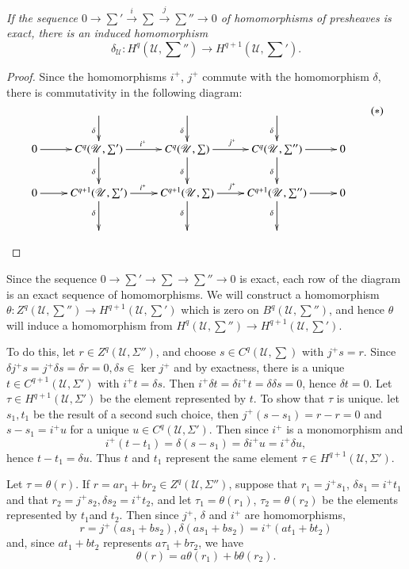\textit{If the sequence $ 0 \to \sum' \xrightarrow{i} \sum
  \xrightarrow{j} \sum'' \to 0$ of homomorphisms of presheaves is
  exact, there is an induced homomorphism} 
$$
\delta_{\mathscr{U}} : H^q (\mathscr{U}, \sum'') \to H^{q+1}
(\mathscr{U}, \sum'). 
$$

\begin{proof}
Since the homomorphisms $i^+$, $j^+$ commute with the homomorphism
$\delta$, there is commutativity in the following diagram: 
\[
\xymatrix{
& \ar[d]_{\delta} & \ar[d]_{\delta} & \ar[d]_{\delta} & \\
0 \ar[r] & C^q(\mathscr{U},\sum') \ar[r]^{i^+} \ar[d]_{\delta} &
C^q(\mathscr{U}, \sum) \ar[d]_{\delta} \ar[r]^{j^+} &
C^q(\mathscr{U},\sum'') \ar[r]\ar[d]_{\delta} & 0 \\
0  \ar[r] & C^{q+1}
(\mathscr{U},\sum')\ar[r]^{i^+}\ar[d]_{\delta} &
C^{q+1}(\mathscr{U},\sum) \ar[r]^{j^+}\ar[d]_{\delta} & C^{q+1}
(\mathscr{U},\sum'') \ar[r]\ar[d]_{\delta} & 0\\
& & & & 
}\tag{$\ast$}
\]
\end{proof}\pageoriginale

Since the sequence $0 \to \sum'\to \sum \to \sum'' \to 0$ is
exact, each row of the diagram is an exact sequence of
homomorphisms. We will construct a homomorphism $\theta : Z^q
(\mathscr{U}, \sum'') \to H^{q+1} (\mathscr{U}, \sum')$ which is
zero on $B^q(\mathscr{U}, \sum'')$, and hence $\theta$ will induce
a homomorphism from $H^q(\mathscr{U}, \sum'') \to
H^{q+1}(\mathscr{U}, \sum')$. 

To do this, let $r \in Z^q (\mathscr{U}, \Sigma'')$, and choose $s \in
C^q (\mathscr{U}, \sum)$ with $j^+ s = r$. Since $\delta j^+ s = j^+
\delta s = \delta r = 0, \delta s \in \ker j^+$ and by exactness,
there is a unique $t \in C^{q+1} (\mathscr{U}, \Sigma')$ with $i^+ t =
\delta s$. Then $i^+ \delta t = \delta i^+ t = \delta \delta s = 0$,
hence $\delta t =0$. Let $\tau \in H^{q+1}(\mathscr{U}, \Sigma')$ be
the element represented by $t$. To show that $\tau$ is unique. let
$s_1, t_1$ be the result of a second such choice, then $j^+ (s - s_1)
= r-r = 0$ and $s - s_1 = i^+ u$ for a unique $u \in C^q (\mathscr{U},
\Sigma')$. Then since $i^+$ is a monomorphism and 
$$
i^+ (t - t_1) = \delta(s - s_1) = \delta i^+ u = i^+ \delta u,
$$
hence $t-t_1 = \delta u$. Thus $t$ and $t_1$ represent the same
element $\tau \in H^{q+1}(\mathscr{U}, \Sigma')$. 

Let $\tau = \theta (r)$. If $r = a r_1 + b r_2 \in Z^q (\mathscr{U},
\Sigma'')$, suppose that $r_1 = j^+ s_1$, $\delta s_1 = i^+ t_1$ and
that $r_2 = j^+ s_2, \delta s_2 = i^+ t_2$, and let $\tau_1 = \theta
(r_1)$, $\tau_2 = \theta (r_2)$ be the elements represented by
$t_1$\pageoriginale and $t_2$. Then since $j^+$, $\delta$ and $i^+$
are homomorphisms,  
$$
r = j^+(a s_1 + b s_2), \delta (a s_1 + b s_2) = i^+ (a t_1 + b t_2)
$$
and, since $a t_1 + bt_2$ represents $a\tau_1 + b \tau_2$, we have
$$
\theta(r) = a \theta (r_1) + b \theta (r_2) .
$$

